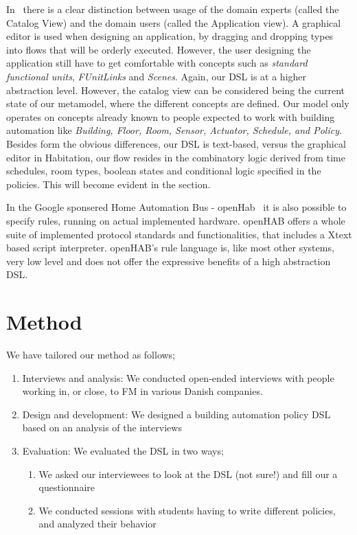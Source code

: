 \documentclass{llncs}
\begin{document}
In~\cite{habitation} there is a clear distinction between usage of the domain experts (called the Catalog View) and the domain users (called the Application view). A graphical editor is used when designing an application, by dragging and dropping types into flows that will be orderly executed. However, the user designing the application still have to get comfortable with concepts such as \textit{standard functional units}, \textit{FUnitLinks} and \textit{Scenes}. Again, our DSL is at a higher abstraction level. However, the catalog view can be considered being the current state of our metamodel, where the different concepts are defined. Our model only operates on concepts already known to people expected to work with building automation like \textit{Building, Floor, Room, Sensor, Actuator, Schedule, and Policy}. Besides form the obvious differences, our DSL is text-based, versus the graphical editor in Habitation, our flow resides in the combinatory logic derived from time schedules, room types, boolean states and conditional logic specified in the policies. This will become evident in the  section.

In the Google sponsered Home Automation Bus - openHab~\cite{openhab} it is also possible to specify rules, running on actual implemented hardware. openHAB offers a whole suite of implemented protocol standards and functionalities, that includes a Xtext based script interpreter. openHAB's rule language is, like most other systems, very low level and does not offer the expressive benefits of a high abstraction DSL.

\section{Method}\label{sec:method}
We have tailored our method as follows;

\begin{enumerate}
	\item Interviews and analysis: We conducted open-ended interviews with people working in, or close, to FM in various Danish companies.
	\item Design and development: We designed a building automation policy DSL based on an analysis of the interviews
	\item Evaluation: We evaluated the DSL in two ways;
	\begin{enumerate}
		\item We asked our interviewees to look at the DSL (not sure!) and fill our a questionnaire
		\item We conducted sessions with students having to write different policies, and analyzed their behavior
	\end{enumerate}
\end{enumerate}
\end{document}
